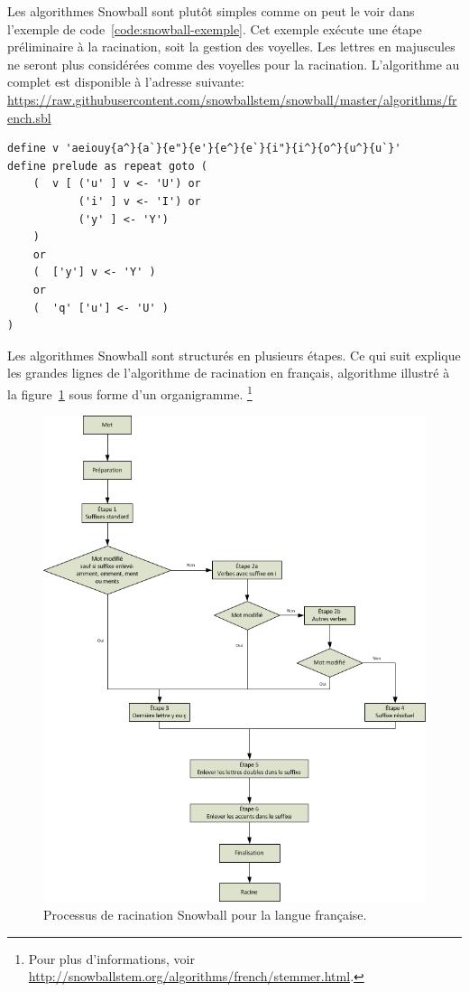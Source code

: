 Les algorithmes Snowball sont plut\^ot simples comme on peut le voir dans l'exemple de code~\ref{code:snowball-exemple}.
Cet exemple ex\'ecute une \'etape pr\'eliminaire \`a la racination, soit la gestion des voyelles.
Les lettres en majuscules ne seront plus consid\'er\'ees comme des voyelles pour la racination.
L'algorithme au complet est disponible \`a l'adresse suivante: \url{https://raw.githubusercontent.com/snowballstem/snowball/master/algorithms/french.sbl}
\begin{lstfloat}
\begin{lstlisting}[frame=l]
define v 'aeiouy{a^}{a`}{e"}{e'}{e^}{e`}{i"}{i^}{o^}{u^}{u`}'
define prelude as repeat goto (
    (  v [ ('u' ] v <- 'U') or
           ('i' ] v <- 'I') or
           ('y' ] <- 'Y')
    )
    or
    (  ['y'] v <- 'Y' )
    or
    (  'q' ['u'] <- 'U' )
)
\end{lstlisting}
\caption{Exemple de l'algorithme de racination en fran\c{c}ais en Snowball.}
\label{code:snowball-exemple}
\end{lstfloat}

Les algorithmes Snowball sont structur\'es en plusieurs \'etapes.
Ce qui suit explique les grandes lignes de l'algorithme de racination en fran\c{c}ais, algorithme illustr\'e \`a la figure~\ref{snowball-process} sous forme d'un organigramme.%
\footnote{Pour plus d'informations, voir \url{http://snowballstem.org/algorithms/french/stemmer.html}.}

\begin{figure}[h!]
  \includegraphics[scale=0.85]{images/snowball.png}
  \caption{Processus de racination Snowball pour la langue fran\c{c}aise.}
  \label{snowball-process}
\end{figure}

